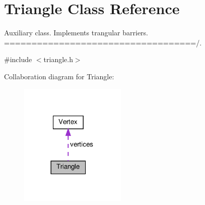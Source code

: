 \hypertarget{class_triangle}{}\section{Triangle Class Reference}
\label{class_triangle}


Auxiliary class. Implements trangular barriers. ===================================/.  




{\ttfamily \#include $<$triangle.\+h$>$}



Collaboration diagram for Triangle\+:\nopagebreak
\begin{figure}[H]
\begin{center}
\leavevmode
\includegraphics[width=144pt]{class_triangle__coll__graph}
\end{center}
\end{figure}
